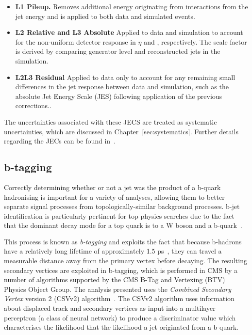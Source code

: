 \begin{itemize}
\item \textbf{L1 Pileup.} Removes additional energy originating from \PU interactions from the jet energy and is applied to both data and simulated events. 
\item \textbf{L2 Relative and L3 Absolute} Applied to data and simulation to account for the non-uniform detector response in $\eta$ and \pT, respectively. The scale factor is derived by comparing generator level and reconstructed jets in the simulation.
\item \textbf{L2L3 Residual} Applied to data only to account for any remaining small differences in the jet response between data and simulation, such as the absolute Jet Energy Scale (JES) following application of the previous corrections..
\end{itemize}

The uncertainties associated with these JECS are treated as systematic uncertainties, which are discussed in Chapter~\ref{sec:systematics}.
Further details regarding the JECs can be found in~\cite{Khachatryan:2016kdb}.

\subsection{b-tagging}\label{subsec:objReco-bJets}
Correctly determining whether or not a jet was the product of a b-quark hadronising is important for a variety of analyses, allowing them to better separate signal processes from topologically-similar background processes.
b-jet identification is particularly pertinent for top physics searches due to the fact that the dominant decay mode for a top quark is to a W boson and a b-quark~\cite{Tanabashi:2018oca}.

This process is known as \emph{b-tagging} and exploits the fact that because b-hadrons have a relatively long lifetime of approximately 1.5 ps~\cite{Beringer:1900zz}, they can travel a measurable distance away from the primary vertex before decaying. 
The resulting secondary vertices are exploited in b-tagging, which is performed in CMS by a number of algorithms supported by the CMS B-Tag and Vertexing (BTV) Physics Object Group.
The analysis presented uses the \emph{Combined Secondary Vertex} version 2 (CSVv2) algorithm~\cite{Sirunyan:2017ezt}.
The CSVv2 algorithm uses information about displaced track and secondary vertices as input into a multilayer perceptron (a class of neural network) to produce a discriminator value which characterises the likelihood that the likelihood a jet originated from a b-quark.

